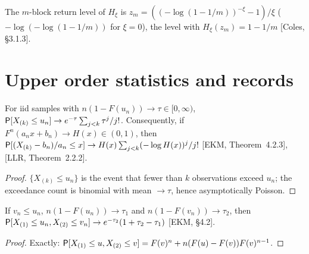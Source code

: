 \begin{definition}
  \label{def:return-level}
  \leanok
  The $m$-block return level of $H_\xi$ is $z_m = ((-\log(1 - 1/m))^{-\xi} - 1)/\xi$
  ($-\log(-\log(1 - 1/m))$ for $\xi = 0$), the level with $H_\xi(z_m) = 1 - 1/m$ [Coles, \S3.1.3].
\end{definition}

\section{Upper order statistics and records}

\begin{theorem}
  \label{thm:kth-largest}
  \leanok
  For iid samples with $n(1 - F(u_n)) \to \tau \in [0, \infty)$,
  $\mathsf{P}[X_{(k)} \le u_n] \to e^{-\tau} \sum_{j < k} \tau^j/j!$. Consequently, if
  $F^n(a_n x + b_n) \to H(x) \in (0, 1)$, then
  $\mathsf{P}[(X_{(k)} - b_n)/a_n \le x] \to H(x) \sum_{j<k} (-\log H(x))^j/j!$
  [EKM, Theorem~4.2.3], [LLR, Theorem~2.2.2].
\end{theorem}
\begin{proof}
  \leanok
  $\{X_{(k)} \le u_n\}$ is the event that fewer than $k$ observations exceed $u_n$; the
  exceedance count is binomial with mean $\to \tau$, hence asymptotically Poisson.
\end{proof}

\begin{theorem}
  \label{thm:two-largest}
  \leanok
  If $v_n \le u_n$, $n(1 - F(u_n)) \to \tau_1$ and $n(1 - F(v_n)) \to \tau_2$, then
  $\mathsf{P}[X_{(1)} \le u_n, X_{(2)} \le v_n] \to e^{-\tau_2}(1 + \tau_2 - \tau_1)$ [EKM, \S4.2].
\end{theorem}
\begin{proof}
  \leanok
  Exactly: $\mathsf{P}[X_{(1)} \le u, X_{(2)} \le v] = F(v)^n + n (F(u) - F(v)) F(v)^{n-1}$.
\end{proof}

